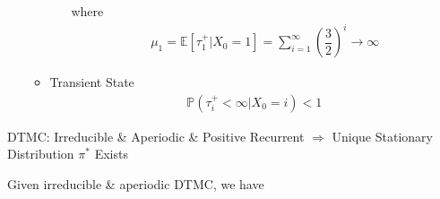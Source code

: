 \begin{itemize}[topsep=2pt,itemsep=0pt]
\begin{itemize}[topsep=2pt,itemsep=0pt]
\begin{itemize}[topsep=2pt,itemsep=0pt]
\begin{center}
                \end{center}

                where 
                \begin{align}
                    \mu _1=\mathbb{E}\left[ \tau_1^+|X_0=1 \right]=\sum_{i=1}^\infty \left(\dfrac{3}{2}\right)^i\to\infty   
                \end{align}
                
                

            \end{itemize} 
            \item Transient State
            \begin{align}
                \mathbb{P}\left( \tau_i^+<\infty|X_0=i    \right)<1 
            \end{align}
        \end{itemize}
        
            
    \end{itemize}
    
\begin{point}
    DTMC: Irreducible \& Aperiodic \& Positive Recurrent $ \Rightarrow  $ Unique Stationary Distribution $ \pi^* $ Exists
\end{point}

Given irreducible \& aperiodic DTMC, we have 

